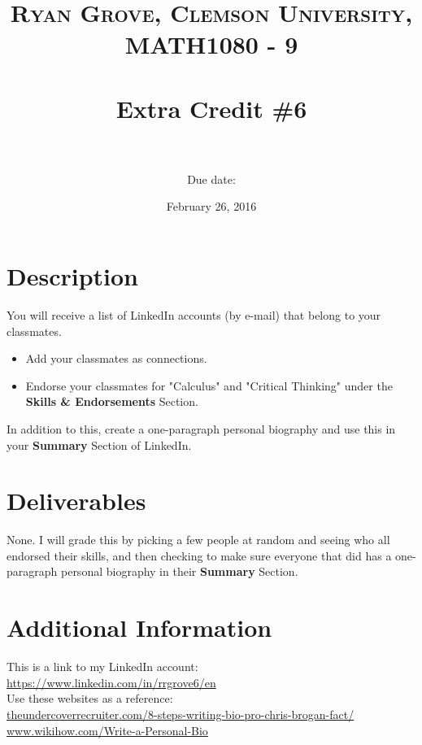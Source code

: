 \documentclass[paper=a4, fontsize=11pt]{scrartcl} %
\title{	
\normalfont \normalsize 
\textsc{Ryan Grove, Clemson University, MATH1080 - 9} \\ [25pt] %
\horrule{0.5pt} \\[0.4cm] %
\huge Extra Credit \#6 \\ %
\horrule{2pt} \\[0.5cm] %
}
\author{Due date:} %
\date{\normalsize February 26, 2016} %
\numberwithin{equation}{section} %
\numberwithin{figure}{section} %
\numberwithin{table}{section} %
\begin{document}
\maketitle %


\section*{\textbf{Description}}

You will receive a list of LinkedIn accounts (by e-mail) that belong to your classmates. 

\begin{itemize}
\item Add your classmates as connections.

\item Endorse your classmates for "Calculus" and "Critical Thinking" under the \textbf{Skills \& Endorsements} Section.
\end{itemize}

In addition to this, create a one-paragraph personal biography and use this in your \textbf{Summary} Section of LinkedIn.


\section*{\textbf{Deliverables}}

None. I will grade this by picking a few people at random and seeing who all endorsed their skills, and then checking to make sure everyone that did has a one-paragraph personal biography in their \textbf{Summary} Section. 


\section*{\textbf{Additional Information}}

This is a link to my LinkedIn account:\\
\url{https://www.linkedin.com/in/rrgrove6/en}\\

Use these websites as a reference:\\
\url{theundercoverrecruiter.com/8-steps-writing-bio-pro-chris-brogan-fact/}\\ \url{www.wikihow.com/Write-a-Personal-Bio}


\end{document}

